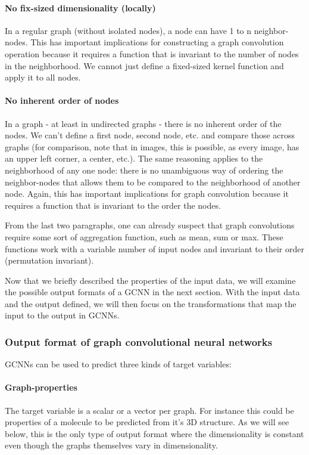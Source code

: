 \paragraph{No fix-sized dimensionality (locally)}
In a regular graph (without isolated nodes), a node can have 1 to n neighbor-nodes. This has important implications for constructing a graph convolution operation because it requires a function that is invariant to the number of nodes in the neighborhood. We cannot just define a fixed-sized kernel function and apply it to all nodes.
\paragraph{No inherent order of nodes}
In a graph - at least in undirected graphs - there is no inherent order of the nodes. We can't define a first node, second node, etc. and compare those across graphs (for comparison, note that in images, this is possible, as every image, has an upper left corner, a center, etc.). The same reasoning applies to the neighborhood of any one node: there is no unambiguous way of ordering the neighbor-nodes that allows them to be compared to the neighborhood of another node. Again, this has important implications for graph convolution because it requires a function that is invariant to the order the nodes.

From the last two paragraphs, one can already suspect that graph convolutions require some sort of aggregation function, such as mean, sum or max. These functions work with a variable number of input nodes and invariant to their order (permutation invariant).

Now that we briefly described the properties of the input data, we will examine the possible output formats of a GCNN in the next section. With the input data and the output defined, we will then focus on the transformations that map the input to the output in GCNNs.

\subsubsection{Output format of graph convolutional neural networks}
\label{sec:graph-output}

GCNNs can be used to predict three kinds of target variables:

\paragraph{Graph-properties}
The target variable is a scalar or a vector per graph. For instance this could be properties of a molecule to be predicted from it's 3D structure. As we will see below, this is the only type of output format where the dimensionality is constant even though the graphs themselves vary in dimensionality.
